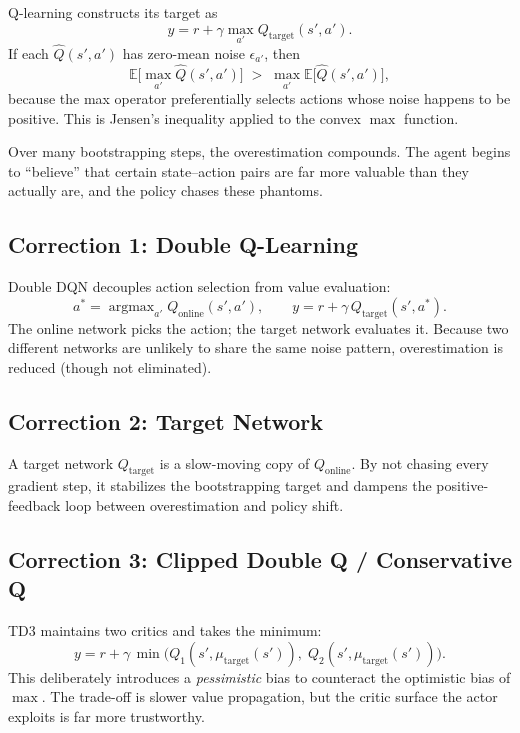Q-learning constructs its target as
\begin{equation}
  y = r + \gamma \max_{a'} Q_{\text{target}}(s', a').
\end{equation}
If each $\hat{Q}(s',a')$ has zero-mean noise $\epsilon_{a'}$, then
\begin{equation}
  \mathbb{E}\!\bigl[\max_{a'} \hat{Q}(s',a')\bigr]
  \;>\; \max_{a'}\mathbb{E}\!\bigl[\hat{Q}(s',a')\bigr],
\end{equation}
because the max operator preferentially selects actions whose noise happens to
be positive.  This is Jensen's inequality applied to the convex $\max$
function.

Over many bootstrapping steps, the overestimation compounds.  The agent begins
to ``believe'' that certain state--action pairs are far more valuable than they
actually are, and the policy chases these phantoms.

\subsection{Correction 1: Double Q-Learning}

Double DQN decouples action selection from value evaluation:
\begin{equation}
  a^{\ast} = \operatorname{argmax}_{a'} Q_{\text{online}}(s', a'),
  \qquad
  y = r + \gamma\, Q_{\text{target}}(s', a^{\ast}).
\end{equation}
The online network picks the action; the target network evaluates it.  Because
two different networks are unlikely to share the same noise pattern,
overestimation is reduced (though not eliminated).

\subsection{Correction 2: Target Network}

A target network $Q_{\text{target}}$ is a slow-moving copy of $Q_{\text{online}}$.
By not chasing every gradient step, it stabilizes the bootstrapping target and
dampens the positive-feedback loop between overestimation and policy shift.

\subsection{Correction 3: Clipped Double Q / Conservative Q}

TD3 maintains two critics and takes the minimum:
\begin{equation}
  y = r + \gamma\, \min\!\bigl(Q_1(s', \mu_{\text{target}}(s')),\;
  Q_2(s', \mu_{\text{target}}(s'))\bigr).
\end{equation}
This deliberately introduces a \emph{pessimistic} bias to counteract the
optimistic bias of $\max$.  The trade-off is slower value propagation, but
the critic surface the actor exploits is far more trustworthy.

